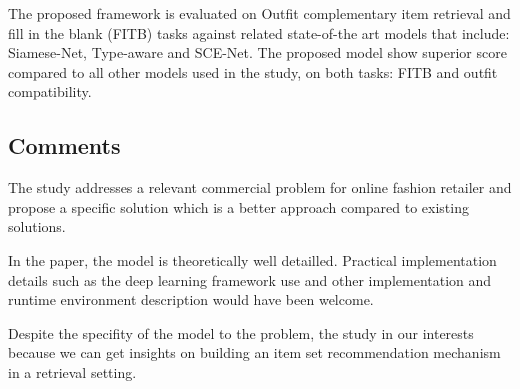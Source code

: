 \documentclass{article}
\begin{document}
The proposed framework is evaluated on Outfit complementary item retrieval
 and fill in the blank (FITB) tasks against related state-of-the art 
models that include: Siamese-Net, Type-aware and SCE-Net.
The proposed model show superior score compared to all other models used in 
the study, on both tasks: FITB and outfit compatibility.


\subsection*{Comments}
The study addresses a relevant commercial problem for online fashion retailer 
and propose a specific solution which is a better approach compared to 
existing solutions. 

In the paper, the model is theoretically well detailled. Practical
implementation details such as the deep learning framework use and other
implementation and runtime environment description would have been welcome. 

Despite the specifity of the model to the problem, the study in our
interests because we can get insights on building an item set recommendation 
mechanism in a retrieval setting.



\end{document}

